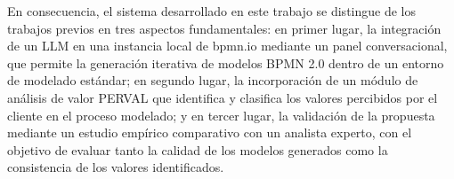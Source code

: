 En consecuencia, el sistema desarrollado en este trabajo se distingue de los trabajos previos en tres aspectos fundamentales: en primer lugar,
la integración de un LLM en una instancia local de bpmn.io mediante un panel conversacional, que permite la generación iterativa de modelos
BPMN 2.0 dentro de un entorno de modelado estándar; en segundo lugar, la incorporación de un módulo de análisis de valor PERVAL que
identifica y clasifica los valores percibidos por el cliente en el proceso modelado; y en tercer lugar, la validación de la propuesta mediante
un estudio empírico comparativo con un analista experto, con el objetivo de evaluar tanto la calidad de los modelos generados como la consistencia de los valores identificados.

